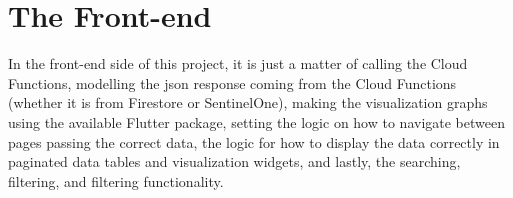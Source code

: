 





\section{The Front-end}

In the front-end side of this project, it is just a matter of calling the Cloud Functions, modelling the \acrshort{json} response
coming from the Cloud Functions (whether it is from Firestore or SentinelOne), making the visualization graphs using the available
Flutter package, setting the logic on how to navigate between pages passing the correct data, the logic for how to display the data
correctly in paginated data tables and visualization widgets, and lastly, the searching, filtering, and filtering functionality.

